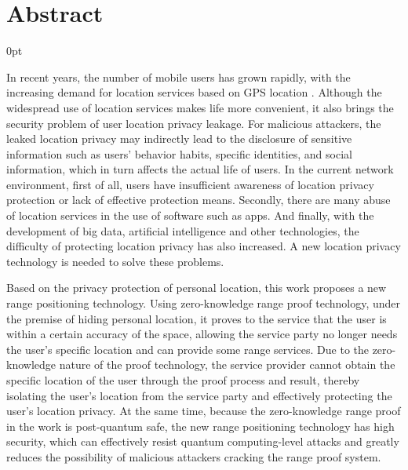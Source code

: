 \documentclass[zihao=-4]{ctexart}
\newcommand{\setParDis}{\setlength {\parskip} {0pt} }
\begin{document}
\section*{\textbf{Abstract}} %
\begin{spacing}{1.5}
\begin{adjustwidth}{0.42cm}{0.42cm}
  \setParDis %

\qquad In recent years, the number of mobile users has grown rapidly, with the increasing demand for location services based on GPS location . Although the widespread use of location services makes life more convenient, it also brings the security problem of user location privacy leakage. For malicious attackers, the leaked location privacy may indirectly lead to the disclosure of sensitive information such as users' behavior habits, specific identities, and social information, which in turn affects the actual life of users. In the current network environment, first of all, users have insufficient awareness of location privacy protection or lack of effective protection means. Secondly, there are many abuse of location services in the use of software such as apps. And finally, with the development of big data, artificial intelligence and other technologies, the difficulty of protecting location privacy has also increased. A new location privacy technology is needed to solve these problems.\par
Based on the privacy protection of personal location, this work proposes a new range positioning technology. Using zero-knowledge range proof technology, under the premise of hiding personal location, it proves to the service that the user is within a certain accuracy of the space, allowing the service party no longer needs the user's specific location and can provide some range services. Due to the zero-knowledge nature of the proof technology, the service provider cannot obtain the specific location of the user through the proof process and result, thereby isolating the user's location from the service party and effectively protecting the user's location privacy. At the same time, because the zero-knowledge range proof in the work is post-quantum safe, the new range positioning technology has high security, which can effectively resist quantum computing-level attacks and greatly reduces the possibility of malicious attackers cracking the range proof system.\par

\end{adjustwidth}
\end{spacing}
\end{document}
